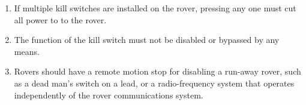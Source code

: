 \begin{enumerate}
\begin{enumerate}
        \item If multiple kill switches are installed on the rover, pressing any one must cut all power to to the rover.
        \item The function of the kill switch must not be disabled or bypassed by any means.
        \item Rovers should have a remote motion stop for disabling a run-away rover, such as a dead man’s switch on a lead, or a radio-frequency system that operates independently of the rover communications system.
    \end{enumerate}
    
\end{enumerate}




